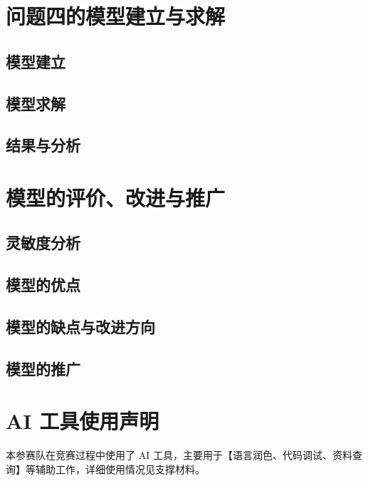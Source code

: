 \documentclass[12pt]{article}
\begin{document}
\section{问题四的模型建立与求解}
\subsection{模型建立}
\subsection{模型求解}
\subsection{结果与分析}

\section{模型的评价、改进与推广}
\subsection{灵敏度分析}

\subsection{模型的优点}

\subsection{模型的缺点与改进方向}

\subsection{模型的推广}

\section*{AI 工具使用声明}
本参赛队在竞赛过程中使用了 AI 工具，主要用于【语言润色、代码调试、资料查询】等辅助工作，详细使用情况见支撑材料。
\end{document}
